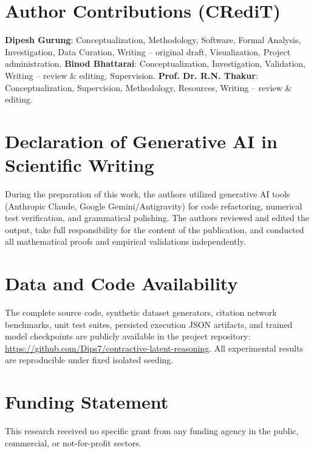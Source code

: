 \documentclass[11pt,a4paper]{article}
\begin{document}
\section*{Author Contributions (CRediT)}
\textbf{Dipesh Gurung}: Conceptualization, Methodology, Software, Formal Analysis, Investigation, Data Curation, Writing -- original draft, Visualization, Project administration. \textbf{Binod Bhattarai}: Conceptualization, Investigation, Validation, Writing -- review \& editing, Supervision. \textbf{Prof. Dr. R.N. Thakur}: Conceptualization, Supervision, Methodology, Resources, Writing -- review \& editing.

\section*{Declaration of Generative AI in Scientific Writing}
During the preparation of this work, the authors utilized generative AI tools (Anthropic Claude, Google Gemini/Antigravity) for code refactoring, numerical test verification, and grammatical polishing. The authors reviewed and edited the output, take full responsibility for the content of the publication, and conducted all mathematical proofs and empirical validations independently.

\section*{Data and Code Availability}
The complete source code, synthetic dataset generators, citation network benchmarks, unit test suites, persisted execution JSON artifacts, and trained model checkpoints are publicly available in the project repository: \url{https://github.com/Dips7/contractive-latent-reasoning}. All experimental results are reproducible under fixed isolated seeding.

\section*{Funding Statement}
This research received no specific grant from any funding agency in the public, commercial, or not-for-profit sectors.



\end{document}
